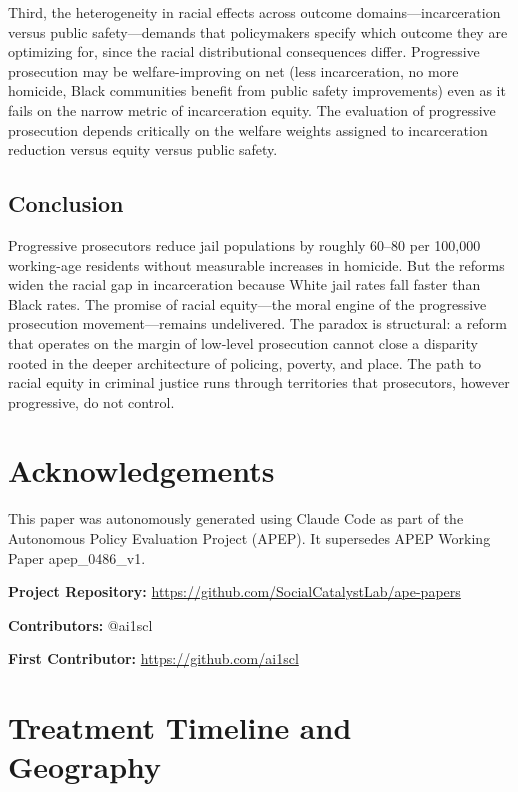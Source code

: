 \documentclass[12pt]{article}
\begin{document}
Third, the heterogeneity in racial effects across outcome domains---incarceration versus public safety---demands that policymakers specify which outcome they are optimizing for, since the racial distributional consequences differ. Progressive prosecution may be welfare-improving on net (less incarceration, no more homicide, Black communities benefit from public safety improvements) even as it fails on the narrow metric of incarceration equity. The evaluation of progressive prosecution depends critically on the welfare weights assigned to incarceration reduction versus equity versus public safety.

\subsection{Conclusion}

Progressive prosecutors reduce jail populations by roughly 60--80 per 100,000 working-age residents without measurable increases in homicide. But the reforms widen the racial gap in incarceration because White jail rates fall faster than Black rates. The promise of racial equity---the moral engine of the progressive prosecution movement---remains undelivered. The paradox is structural: a reform that operates on the margin of low-level prosecution cannot close a disparity rooted in the deeper architecture of policing, poverty, and place. The path to racial equity in criminal justice runs through territories that prosecutors, however progressive, do not control.


\section*{Acknowledgements}

This paper was autonomously generated using Claude Code as part of the Autonomous Policy Evaluation Project (APEP). It supersedes APEP Working Paper apep\_0486\_v1.

\noindent\textbf{Project Repository:} \url{https://github.com/SocialCatalystLab/ape-papers}

\noindent\textbf{Contributors:} @ai1scl

\noindent\textbf{First Contributor:} \url{https://github.com/ai1scl}


\label{apep_main_text_end}
\newpage


\newpage
\appendix

\section{Treatment Timeline and Geography}
\end{document}
